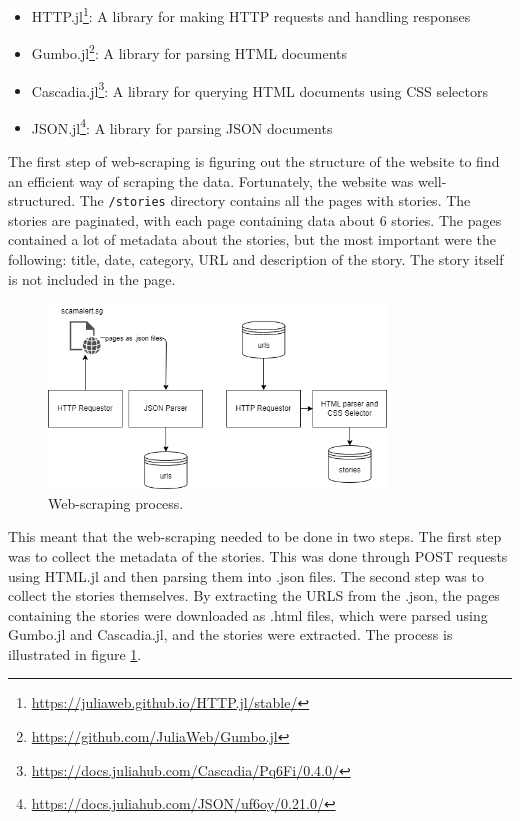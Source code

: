 \begin{itemize}
    \item HTTP.jl\footnote[0]{\url{https://juliaweb.github.io/HTTP.jl/stable/}}: A library for making HTTP requests and handling responses 
    \item Gumbo.jl\footnote[1]{\url{https://github.com/JuliaWeb/Gumbo.jl}}: A library for parsing HTML documents
    \item Cascadia.jl\footnote[2]{\url{https://docs.juliahub.com/Cascadia/Pq6Fi/0.4.0/}}: A library for querying HTML documents using CSS selectors
    \item JSON.jl\footnote[3]{\url{https://docs.juliahub.com/JSON/uf6oy/0.21.0/}}: A library for parsing JSON documents
\end{itemize}

The first step of web-scraping is figuring out the structure of the website to find an efficient way of scraping the data. Fortunately, the website was well-structured. The \texttt{/stories} directory contains all the pages with stories. The stories are paginated, with each page containing data about 6 stories. The pages contained a lot of metadata about the stories, but the most important were the following: title, date, category, URL and description of the story. The story itself is not included in the page. 

\begin{figure}
    \centering
    \includegraphics[width=0.8\textwidth]{resources/webscraper.drawio.png}
    \caption{Web-scraping process.}
    \label{fig:web-scraping}
\end{figure}

This meant that the web-scraping needed to be done in two steps. The first step was to collect the metadata of the stories. This was done through POST requests using HTML.jl and then parsing them into .json files. The second step was to collect the stories themselves. By extracting the URLS from the .json, the pages containing the stories were downloaded as .html files, which were parsed using Gumbo.jl and Cascadia.jl, and the stories were extracted. The process is illustrated in figure \ref{fig:web-scraping}.

